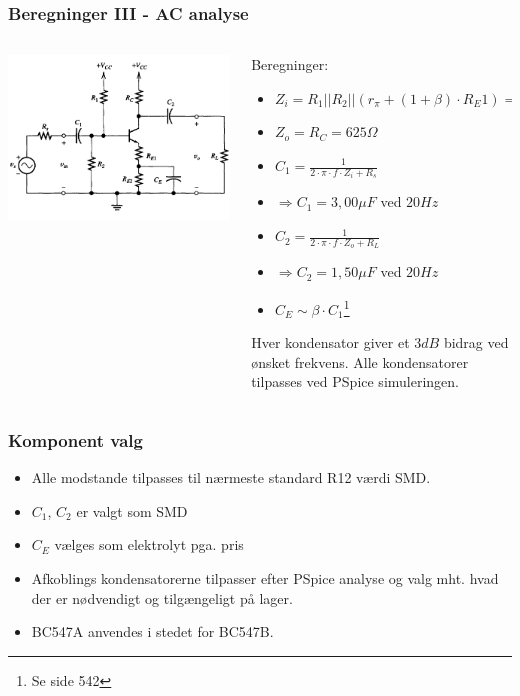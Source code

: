 \documentclass{beamer}
\begin{document}
\begin{frame}
	\frametitle{Beregninger III - AC analyse}
	\begin{columns}[onlytextwidth]
  \begin{column}{0.4\textwidth}
    \begin{center}
		\includegraphics[width=1\textwidth]{images/trans_topo1.png}
	\end{center}
  \end{column}
  \begin{column}{0.6\textwidth}
	Beregninger:
	\begin{itemize}
	\item $Z_i = R_1||R_2||(r_{\pi}+(1+\beta)\cdot R_E1) = 5,15k\Omega$
	\item $Z_o = R_C = 625\Omega$
	\item $C_1 = \frac{1}{2\cdot \pi \cdot f \cdot Z_{i}+R_{s}}$
	\item $\Rightarrow C_1= 3,00\mu F$ ved $20Hz$
	\item $C_2 = \frac{1}{2\cdot \pi \cdot f \cdot Z_{o}+R_{L}}$
	\item $\Rightarrow C_2= 1,50\mu F$ ved $20Hz$
	\item $C_E \sim \beta \cdot C_1$\footnote{Se side 542}
	\end{itemize}
	Hver kondensator giver et $3dB$ bidrag ved ønsket frekvens. Alle kondensatorer tilpasses ved PSpice simuleringen. 
  \end{column}
\end{columns}
\end{frame}

\begin{frame}
	\frametitle{Komponent valg}
	\begin{itemize}
		\item Alle modstande tilpasses til nærmeste standard R12 værdi SMD. 
		\item  $C_1$, $C_2$ er valgt som SMD
		\item $C_E$ vælges som elektrolyt pga. pris
		\item Afkoblings kondensatorerne tilpasser efter PSpice analyse og valg mht. hvad der er nødvendigt og tilgængeligt på lager.
		\item BC547A anvendes i stedet for BC547B.  
	\end{itemize}
\end{frame}
\end{document}
